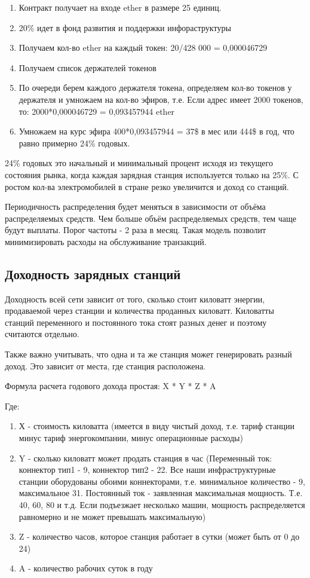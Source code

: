 \documentclass[a4paper,12pt]{report}
\begin{document}
\begin{enumerate}
	\item Контракт получает на входе ether в размере 25 единиц.
	\item 20\% идет в фонд развития и поддержки инфораструктуры
	\item Получаем кол-во ether на каждый токен: 20/428 000 = 0,000046729
	\item Получаем список держателей токенов
	\item По очереди берем каждого держателя токена, определяем кол-во токенов у держателя и умножаем на кол-во эфиров, т.е. Если адрес имеет 2000 токенов, то: 2000*0,000046729 = 0,093457944 ether
	\item Умножаем на курс эфира 400*0,093457944 = 37\$ в мес или 444\$ в год, что равно примерно 24\% годовых. 
\end{enumerate}


24\% годовых это начальный и минимальный процент исходя из текущего состояния рынка, когда каждая зарядная станция используется только на 25\%. С ростом кол-ва электромобилей в стране резко увеличится и доход со станций.  

Периодичность распределения будет меняться в зависимости от объёма распределяемых средств. Чем больше объём распределяемых средств, тем чаще будут выплаты. Порог частоты - 2 раза в месяц. Такая модель позволит минимизировать расходы на обслуживание транзакций.

\subsection{Доходность зарядных станций}

Доходность всей сети зависит от того, сколько стоит киловатт энергии, продаваемой через станции и количества проданных киловатт. Киловатты станций переменного и постоянного тока стоят разных денег и поэтому считаются отдельно. 

Также важно учитывать, что одна и та же станция может генерировать разный доход. Это зависит от места, где станция расположена.

Формула расчета годового дохода простая: X * Y * Z * A 


Где:
\begin{enumerate}

	\item Х - стоимость киловатта (имеется в виду чистый доход, т.е. тариф станции минус тариф энергокомпании, минус операционные расходы)

	\item Y - сколько киловатт может продать станция в час (Переменный ток: коннектор тип1 - 9, коннектор тип2 - 22. Все наши инфраструктурные станции оборудованы обоими коннекторами, т.е. минимальное количество - 9, максимальное 31. Постоянный ток - заявленная максимальная мощность. Т.е. 40, 60, 80 и т.д. Если подъезжает несколько машин, мощность распределяется равномерно и не может превышать максимальную)

	\item Z - количество часов, которое станция работает в сутки (может быть от 0 до 24)
	\item A - количество рабочих суток в году 
\end{enumerate}
\end{document}
